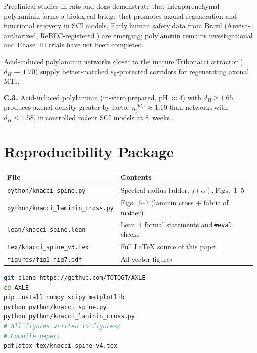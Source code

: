 \documentclass[12pt,a4paper]{article}
\newcommand{\etatrib}{\eta_3}
\newcommand{\falph}{f(\alpha)}
\begin{document}
Preclinical studies in rats \cite{menezes2010} and dogs \cite{chize2025}
demonstrate that intraparenchymal polylaminin forms a biological bridge
that promotes axonal regeneration and functional recovery in SCI models.
Early human safety data from Brazil (Anvisa-authorized, ReBEC-registered
\cite{sampaio2025}) are emerging; polylaminin remains investigational
and Phase~III trials have not been completed.

Acid-induced polylaminin networks closer to the mature Tribonacci attractor
($d_H\to 1.70$) supply better-matched $\varepsilon_0$-protected corridors
for regenerating axonal MTs.

\begin{falsbox}
\textbf{C.3.} Acid-induced polylaminin (in-vitro prepared,
pH $\approx 4$) with $d_H\geq 1.65$ produces axonal density greater by
factor $\etatrib^{\Delta d_H}\approx 1.10$ than networks with
$d_H\leq 1.58$, in controlled rodent SCI models at 8~weeks
\cite{menezes2010}.
\end{falsbox}


\section{Reproducibility Package}
\label{sec:repro}

\begin{center}
\begin{tabular}{ll}
\toprule
File & Contents \\
\midrule
\texttt{python/knacci\_spine.py} &
  Spectral radius ladder, $\falph$, Figs.~1--5\\
\texttt{python/knacci\_laminin\_cross.py} &
  Figs.~6--7 (laminin cross + fabric of matter)\\
\texttt{lean/knacci\_spine.lean} &
  Lean~4 formal statements and \texttt{\#eval} checks\\
\texttt{tex/knacci\_spine\_v3.tex} &
  Full \LaTeX{} source of this paper\\
\texttt{figures/fig1--fig7.pdf} &
  All vector figures\\
\bottomrule
\end{tabular}
\end{center}

\begin{lstlisting}[language=bash,caption={Full reproduction}]
git clone https://github.com/TOTOGT/AXLE
cd AXLE
pip install numpy scipy matplotlib
python python/knacci_spine.py
python python/knacci_laminin_cross.py
# All figures written to figures/
# Compile paper:
pdflatex tex/knacci_spine_v4.tex
\end{lstlisting}
\end{document}
